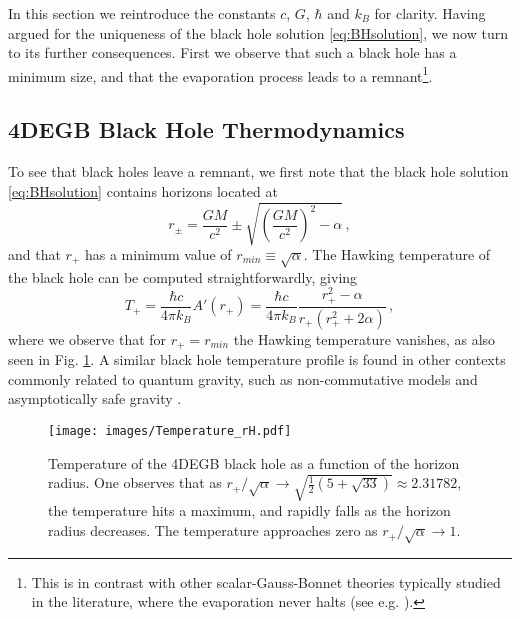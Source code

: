 \documentclass[reprint,amsmath,amssymbGaps,onecolumn,notitlepage,nofootinbib]{revtex4-1}
\newcommand{\br}[1]{\left(#1\right)}
\begin{document}
\par In this section we reintroduce the constants $c$, $G$, $\hbar$ and $k_B$ for clarity. Having argued for  the uniqueness of the black hole solution \eqref{eq:BHsolution},  we now turn to its further consequences.  First we observe that such a black hole has a minimum size, and that the evaporation process leads to a remnant\footnote{This is in contrast with other scalar-Gauss-Bonnet theories typically studied in the literature, where the evaporation never halts (see e.g. \cite{Kanti:1996gs}).}.

\subsection{4DEGB Black Hole Thermodynamics}

To see that black holes leave a remnant, we first note that the black hole solution \eqref{eq:BHsolution} contains horizons located at
\begin{equation}
r_\pm = \frac{G M}{c^2} \pm \sqrt{\br{\frac{GM}{c^2}}^2-\alpha}\, ,
\end{equation}
and that $r_+$ has a minimum value of  $ r_{min} \equiv \sqrt{\alpha}$. 
The Hawking temperature of the black hole can be computed straightforwardly, giving
\begin{equation}
T_+ = \frac{\hbar c}{4\pi k_B} A'(r_+) = \frac{\hbar c}{4\pi k_B}\frac{r_+^2-\alpha }{r_+ \left(r_+^2 + 2 \alpha\right)}\,,
\end{equation}
where we observe that for $r_+=r_{min}$ the Hawking temperature vanishes, as also seen in Fig. \ref{fig:tempRH}. A similar black hole temperature profile is found in other contexts commonly related to quantum gravity, such as non-commutative models \cite{Nicolini:2005vd,Kovacik:2015yqa,Dymnikova:1992ux,Kovacik:2021qms,Gennaro:2021amf} and asymptotically safe gravity \cite{Bonanno:2006eu,Koch:2014cqa,Gennaro:2021amf}.

\begin{figure}[ht!]
\centering
\texttt{[image: images/Temperature\_rH.pdf]}
\caption{Temperature of the 4DEGB black hole as a function of the horizon radius. One observes that as $r_+/\sqrt{\alpha} \to \sqrt{\frac{1}{2}\br{5+\sqrt{33}}} \approx 2.31782$, the temperature hits a maximum, and rapidly falls as the horizon radius decreases. The temperature approaches zero as $r_+ /\sqrt{\alpha} \to 1$.}
\label{fig:tempRH}
\end{figure}
\end{document}
